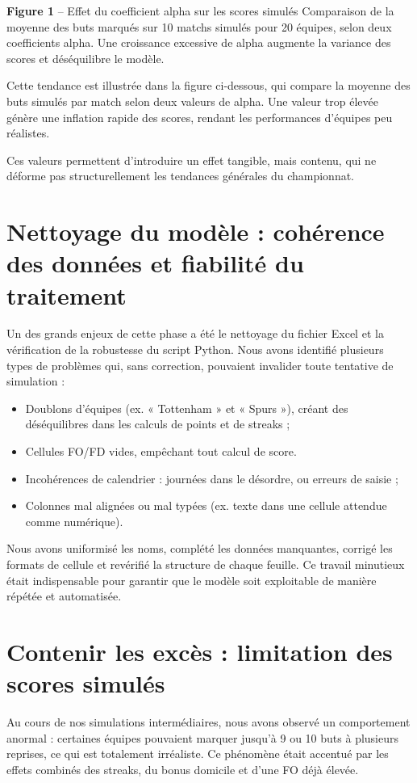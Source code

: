 \documentclass[12pt]{report}
\begin{document}
\textbf{Figure 1} – Effet du coefficient alpha sur les scores simulés
Comparaison de la moyenne des buts marqués sur 10 matchs simulés pour 20 équipes, selon deux coefficients alpha. Une croissance excessive de alpha augmente la variance des scores et déséquilibre le modèle.

Cette tendance est illustrée dans la figure ci-dessous, qui compare la moyenne des buts simulés par match selon deux valeurs de alpha. Une valeur trop élevée génère une inflation rapide des scores, rendant les performances d’équipes peu réalistes.

Ces valeurs permettent d’introduire un effet tangible, mais contenu, qui ne déforme pas structurellement les tendances générales du championnat.

\section{Nettoyage du modèle : cohérence des données et fiabilité du traitement}

Un des grands enjeux de cette phase a été le nettoyage du fichier Excel et la vérification de la robustesse du script Python. Nous avons identifié plusieurs types de problèmes qui, sans correction, pouvaient invalider toute tentative de simulation :
\begin{itemize}
  \item Doublons d’équipes (ex. « Tottenham » et « Spurs »), créant des déséquilibres dans les calculs de points et de streaks ;
  \item Cellules FO/FD vides, empêchant tout calcul de score.
  \item Incohérences de calendrier : journées dans le désordre, ou erreurs de saisie ;
  \item Colonnes mal alignées ou mal typées (ex. texte dans une cellule attendue comme numérique).
\end{itemize}

Nous avons uniformisé les noms, complété les données manquantes, corrigé les formats de cellule et revérifié la structure de chaque feuille. Ce travail minutieux était indispensable pour garantir que le modèle soit exploitable de manière répétée et automatisée.

\section{Contenir les excès : limitation des scores simulés}

Au cours de nos simulations intermédiaires, nous avons observé un comportement anormal : certaines équipes pouvaient marquer jusqu’à 9 ou 10 buts à plusieurs reprises, ce qui est totalement irréaliste. Ce phénomène était accentué par les effets combinés des streaks, du bonus domicile et d’une FO déjà élevée.
\end{document}
